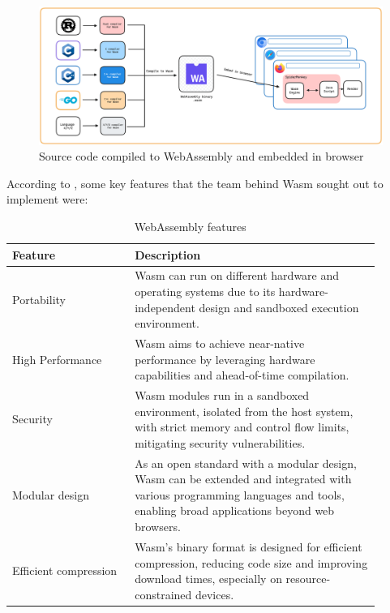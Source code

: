 \documentclass[
  table]{report}
\begin{document}
\begin{figure}[H]
\centering
  \includegraphics{assets/wasm-browser.png}
  \caption{Source code compiled to WebAssembly and embedded in browser}
  \label{fig:wasm-browser}
\end{figure}

According to \citet{haasBringingWebSpeed2017}, some key features that
the team behind \ac{Wasm} sought out to implement were:

\begin{table}[ht]
\centering
\caption{WebAssembly features}
\begin{tabular}{@{}p{0.3\linewidth}@{\hskip\tabcolsep}p{0.6\linewidth}@{}}
\toprule
\textbf{Feature} & \textbf{Description} \\
\midrule

\rowcolor{green!10} Portability & Wasm can run on different hardware and
operating systems due to its hardware-independent design and sandboxed
execution environment. \\

High Performance & Wasm aims to achieve near-native performance by leveraging
hardware capabilities and ahead-of-time compilation. \\

\rowcolor{green!10} Security & Wasm modules run in a sandboxed environment,
isolated from the host system, with strict memory and control flow limits,
mitigating security vulnerabilities. \\

Modular design & As an open standard with a modular design, Wasm can be
extended and integrated with various programming languages and tools, enabling
broad applications beyond web browsers. \\

\rowcolor{green!10} Efficient compression & Wasm's binary format is designed for
efficient compression, reducing code size and improving download times,
especially on resource-constrained devices. \\

\bottomrule
\end{tabular}
\label{table:wasm_benefits}
\end{table}
\end{document}
